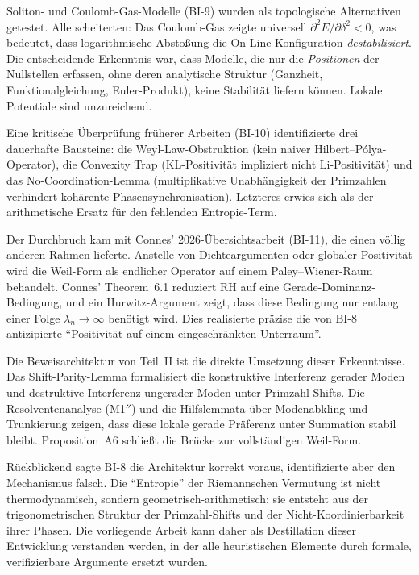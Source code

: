 \documentclass[12pt,a4paper]{article}
\theoremstyle{definition}
\theoremstyle{remark}
\begin{document}
Soliton- und Coulomb-Gas-Modelle (BI-9) wurden als topologische Alternativen getestet. Alle scheiterten: Das Coulomb-Gas zeigte universell $\partial^2 E/\partial\delta^2 < 0$, was bedeutet, dass logarithmische Abstoßung die On-Line-Konfiguration \emph{destabilisiert}. Die entscheidende Erkenntnis war, dass Modelle, die nur die \emph{Positionen} der Nullstellen erfassen, ohne deren analytische Struktur (Ganzheit, Funktionalgleichung, Euler-Produkt), keine Stabilität liefern können. Lokale Potentiale sind unzureichend.

Eine kritische Überprüfung früherer Arbeiten (BI-10) identifizierte drei dauerhafte Bausteine: die Weyl-Law-Obstruktion (kein naiver Hilbert--P\'olya-Operator), die Convexity Trap (KL-Positivität impliziert nicht Li-Positivität) und das No-Coordination-Lemma (multiplikative Unabhängigkeit der Primzahlen verhindert kohärente Phasensynchronisation). Letzteres erwies sich als der arithmetische Ersatz für den fehlenden Entropie-Term.

Der Durchbruch kam mit Connes' 2026-Übersichtsarbeit \cite{Connes2026} (BI-11), die einen völlig anderen Rahmen lieferte. Anstelle von Dichteargumenten oder globaler Positivität wird die Weil-Form als endlicher Operator auf einem Paley--Wiener-Raum behandelt. Connes' Theorem~6.1 reduziert RH auf eine Gerade-Dominanz-Bedingung, und ein Hurwitz-Argument zeigt, dass diese Bedingung nur entlang einer Folge $\lambda_n \to \infty$ benötigt wird. Dies realisierte präzise die von BI-8 antizipierte ``Positivität auf einem eingeschränkten Unterraum''.

Die Beweisarchitektur von Teil~II ist die direkte Umsetzung dieser Erkenntnisse. Das Shift-Parity-Lemma formalisiert die konstruktive Interferenz gerader Moden und destruktive Interferenz ungerader Moden unter Primzahl-Shifts. Die Resolventenanalyse (M1$''$) und die Hilfslemmata über Modenabkling und Trunkierung zeigen, dass diese lokale gerade Präferenz unter Summation stabil bleibt. Proposition~A6 schließt die Brücke zur vollständigen Weil-Form.

Rückblickend sagte BI-8 die Architektur korrekt voraus, identifizierte aber den Mechanismus falsch. Die ``Entropie'' der Riemannschen Vermutung ist nicht thermodynamisch, sondern geometrisch-arithmetisch: sie entsteht aus der trigonometrischen Struktur der Primzahl-Shifts und der Nicht-Koordinierbarkeit ihrer Phasen. Die vorliegende Arbeit kann daher als Destillation dieser Entwicklung verstanden werden, in der alle heuristischen Elemente durch formale, verifizierbare Argumente ersetzt wurden.
\end{document}
